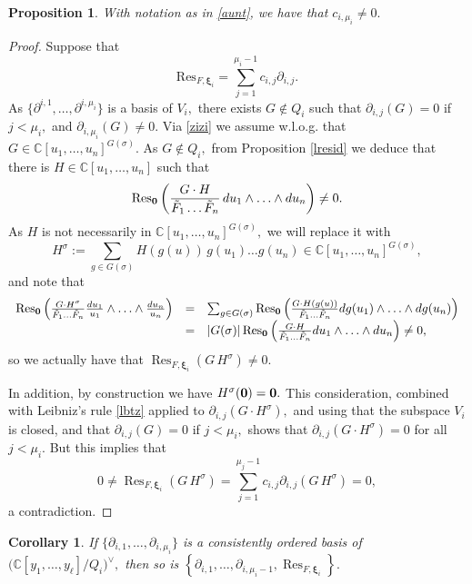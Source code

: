 \documentclass[a4paper,11pt]{amsart}
\newcommand{\Res}{\operatorname{Res}}
\newcommand{\C}{\mathbb{C}}
\newcommand{\bfxi}{{\boldsymbol{\xi}}}
\newcounter{thm}
\numberwithin{thm}{section}
\numberwithin{equation}{section}
\theoremstyle{definition}
\theoremstyle{plain}
\newtheorem{proposition}[thm]{Proposition}
\newtheorem{corollary}[thm]{Corollary}
\begin{document}
\begin{proposition}\label{neq}
With notation as in \eqref{aunt}, we have that $c_{i,\mu_i}\neq0.$
\end{proposition}
\begin{proof}
Suppose that 
\begin{equation}\label{an}
\mbox{Res}_{F,\bfxi_i}=\sum_{j=1}^{\mu_i-1} c_{i,j}\partial_{i,j}.
\end{equation}
 As $\{\partial^{i,1},\ldots, \partial^{i,\mu_i}\}$ is a basis of $V_i,$ there exists $G\notin Q_i$ such that $\partial_{i,j}(G)=0$ if $j<\mu_i,$ and $\partial_{i,\mu_i}(G)\neq0.$   Via \eqref{zizi} we assume w.l.o.g. that $G\in\C[u_1,\ldots, u_n]^{G(\sigma)}.$ As $G\notin Q_i,$ from Proposition \ref{lresid} we deduce that  there is $H\in\C[u_1,\ldots, u_n]$ such that
\begin{equation}\label{deux}
\Res_{\bf0}\left(\frac{G \cdot H}{\tilde{F}_{1}\ldots \tilde{F}_n}\,d u_1\wedge\ldots\wedge d u_n\right)\neq0.
\end{equation}
As $H$ is not necessarily in $\C[u_1,\ldots, u_n]^{G(\sigma)},$ we will replace it with 
$$H^\sigma:=\sum_{g\in G(\sigma)} H(g(u))\, g(u_1)\ldots g(u_n)\in\C[u_1,\ldots, u_n]^{G(\sigma)},$$ and note that
$$\begin{array}{ccl}
\Res_{\bf0}\left(\frac{G \cdot H^\sigma}{\tilde{F}_{1}\ldots \tilde{F}_n}\frac{d u_1}{u_1}\wedge\ldots\wedge \frac{d u_n}{u_n}\right)& = &
\sum_{g\in G(\sigma)}\Res_{\bf0}\left(\frac{G \cdot H(g(u))}{\tilde{F}_{1}\ldots \tilde{F}_n}d g(u_1)\wedge\ldots\wedge dg( u_n)\right)\\
&=& |G(\sigma)|\Res_{\bf0}\left(\frac{G \cdot H}{\tilde{F}_{1}\ldots \tilde{F}_n}d u_1\wedge\ldots\wedge d u_n\right)\neq0,
\end{array}
$$
so we actually have that $\Res_{F,\bfxi_i}(G\,H^\sigma)\neq0.$ 

In addition, by construction we have $H^\sigma(\bf0)=0.$ 
This consideration, combined with Leibniz's rule \eqref{lbtz} applied to $\partial_{i,j}(G\cdot H^\sigma),$ and using that the subspace $V_i$ is closed,  and that $\partial_{i,j}(G)=0$ if $j<\mu_i,$  shows that 
 $\partial_{i,j}(G\cdot H^\sigma)=0$ for all $j<\mu_i.$ But this implies that 
 $$0\neq \Res_{F,\bfxi_i}(G\,H^\sigma)=\sum_{j=1}^{\mu_j-1}c_{i,j} \partial_{i, j}(G\,H^\sigma)=0,$$ 
a contradiction.
\end{proof}

\begin{corollary}\label{colau}
If $\{\partial_{i,1},\ldots, \partial_{i,\mu_i}\}$ is a consistently ordered basis of  $\Big(\C[y_1,\ldots, y_\ell]/ Q_i\Big)^\vee,$ then so is $\left\{\partial_{i,1},\ldots, \partial_{i,\mu_i-1},\Res_{F,\bfxi_i}\right\}.$
\end{corollary}
\end{document}
